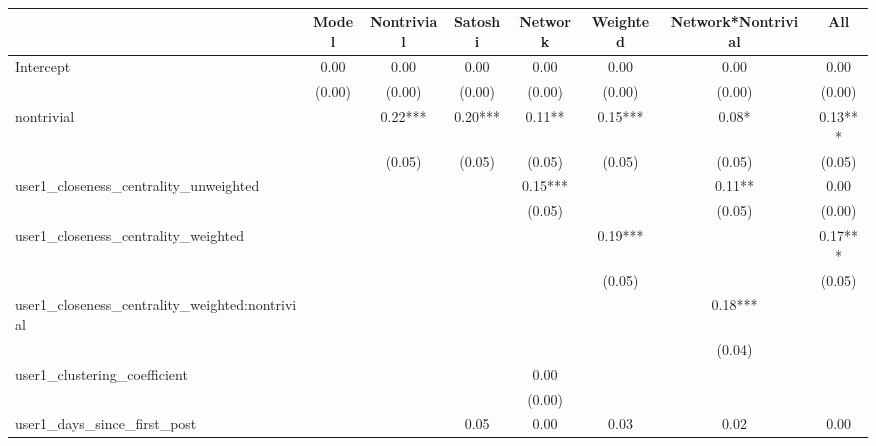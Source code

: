 \begin{table}
\caption{}
\begin{center}
\begin{tabular}{lccccccc}
\hline
                                               & Model    & Nontrivial & Satoshi & Network & Weighted & Network*Nontrivial &   All    \\
\hline
\hline
Intercept                                      & 0.00     & 0.00       & 0.00    & 0.00    & 0.00     & 0.00               & 0.00     \\
                                               & (0.00)   & (0.00)     & (0.00)  & (0.00)  & (0.00)   & (0.00)             & (0.00)   \\
nontrivial                                     &          & 0.22***    & 0.20*** & 0.11**  & 0.15***  & 0.08*              & 0.13***  \\
                                               &          & (0.05)     & (0.05)  & (0.05)  & (0.05)   & (0.05)             & (0.05)   \\
user1_closeness_centrality_unweighted          &          &            &         & 0.15*** &          & 0.11**             & 0.00     \\
                                               &          &            &         & (0.05)  &          & (0.05)             & (0.00)   \\
user1_closeness_centrality_weighted            &          &            &         &         & 0.19***  &                    & 0.17***  \\
                                               &          &            &         &         & (0.05)   &                    & (0.05)   \\
user1_closeness_centrality_weighted:nontrivial &          &            &         &         &          & 0.18***            &          \\
                                               &          &            &         &         &          & (0.04)             &          \\
user1_clustering_coefficient                   &          &            &         & 0.00    &          &                    &          \\
                                               &          &            &         & (0.00)  &          &                    &          \\
user1_days_since_first_post                    &          &            & 0.05    & 0.00    & 0.03     & 0.02               & 0.00     \\

\end{tabular}
\end{center}
\end{table}

